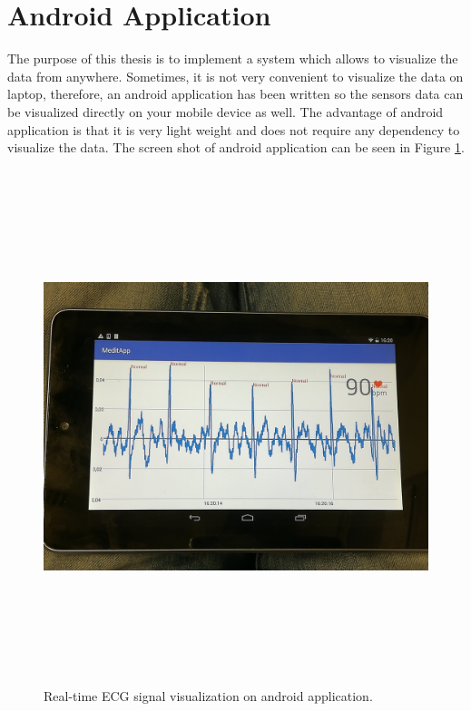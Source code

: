 \section{Android Application}
The purpose of this thesis is to implement a system which allows to visualize the data from anywhere. Sometimes, it is not very convenient to visualize the data on laptop, therefore, an android application has been written so the sensors data can be visualized directly on your mobile device as well. The advantage of android application is that it is very light weight and does not require any dependency to visualize the data. The screen shot of android application can be seen in Figure \ref{fig:ecg_and}.

\begin{figure}[htpb]
	\centering
	\includegraphics[width=16cm,height=15cm,keepaspectratio=true]{images/ecg_and}
	\caption{
		Real-time ECG signal visualization on android application.
	}
	\label{fig:ecg_and}
\end{figure}
 